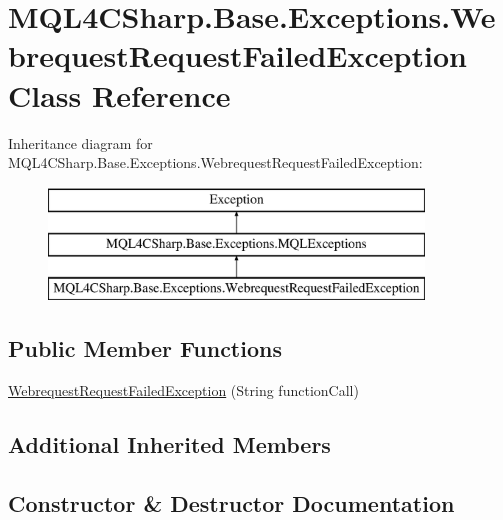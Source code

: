 \hypertarget{class_m_q_l4_c_sharp_1_1_base_1_1_exceptions_1_1_webrequest_request_failed_exception}{}\section{M\+Q\+L4\+C\+Sharp.\+Base.\+Exceptions.\+Webrequest\+Request\+Failed\+Exception Class Reference}
\label{class_m_q_l4_c_sharp_1_1_base_1_1_exceptions_1_1_webrequest_request_failed_exception}
Inheritance diagram for M\+Q\+L4\+C\+Sharp.\+Base.\+Exceptions.\+Webrequest\+Request\+Failed\+Exception\+:\begin{figure}[H]
\begin{center}
\leavevmode
\includegraphics[height=3.000000cm]{class_m_q_l4_c_sharp_1_1_base_1_1_exceptions_1_1_webrequest_request_failed_exception}
\end{center}
\end{figure}
\subsection*{Public Member Functions}
\begin{DoxyCompactItemize}
\item 
\hyperlink{class_m_q_l4_c_sharp_1_1_base_1_1_exceptions_1_1_webrequest_request_failed_exception_a6c5b84368565729801ef5c785156f72c}{Webrequest\+Request\+Failed\+Exception} (String function\+Call)
\end{DoxyCompactItemize}
\subsection*{Additional Inherited Members}


\subsection{Constructor \& Destructor Documentation}
